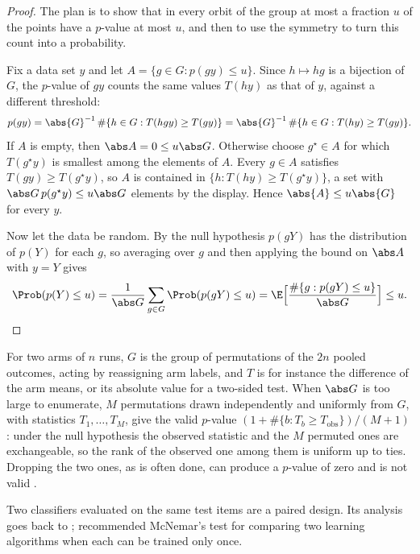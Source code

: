 \begin{refsection}
\begin{proof}
The plan is to show that in every orbit of the group at most a fraction $u$ of the points have a $p$-value at most $u$, and then to use the symmetry to turn this count into a probability.

Fix a data set $y$ and let $A=\{g\in G:p(gy)\le u\}$. Since $h\mapsto hg$ is a bijection of $G$, the $p$-value of $gy$ counts the same values $T(hy)$ as that of $y$, against a different threshold:
\[
p(gy)=\abs{G}^{-1}\,\#\{h\in G:T(hgy)\ge T(gy)\}=\abs{G}^{-1}\,\#\{h\in G:T(hy)\ge T(gy)\}.
\]
If $A$ is empty, then $\abs A=0\le u\abs G$. Otherwise choose $g^\star\in A$ for which $T(g^\star y)$ is smallest among the elements of $A$. Every $g\in A$ satisfies $T(gy)\ge T(g^\star y)$, so $A$ is contained in $\{h:T(hy)\ge T(g^\star y)\}$, a set with $\abs G\,p(g^\star y)\le u\abs G$ elements by the display. Hence $\abs{A}\le u\abs{G}$ for every $y$.

Now let the data be random. By the null hypothesis $p(gY)$ has the distribution of $p(Y)$ for each $g$, so averaging over $g$ and then applying the bound on $\abs A$ with $y=Y$ gives
\[
\Prob(p(Y)\le u)=\frac1{\abs G}\sum_{g\in G}\Prob(p(gY)\le u)=\E\Bigl[\frac{\#\{g:p(gY)\le u\}}{\abs G}\Bigr]\le u.\qedhere
\]
\end{proof}

For two arms of $n$ runs, $G$ is the group of permutations of the $2n$ pooled outcomes, acting by reassigning arm labels, and $T$ is for instance the difference of the arm means, or its absolute value for a two-sided test. When $\abs G$ is too large to enumerate, $M$ permutations drawn independently and uniformly from $G$, with statistics $T_1,\dots,T_M$, give the valid $p$-value $(1+\#\{b:T_b\ge T_{\mathrm{obs}}\})/(M+1)$: under the null hypothesis the observed statistic and the $M$ permuted ones are exchangeable, so the rank of the observed one among them is uniform up to ties. Dropping the two ones, as is often done, can produce a $p$-value of zero and is not valid \parencite{PhipsonSmyth2010}.

Two classifiers evaluated on the same test items are a paired design. Its analysis goes back to \textcite{McNemar1947}; \textcite{Dietterich1998} recommended McNemar's test for comparing two learning algorithms when each can be trained only once.


\end{refsection}
